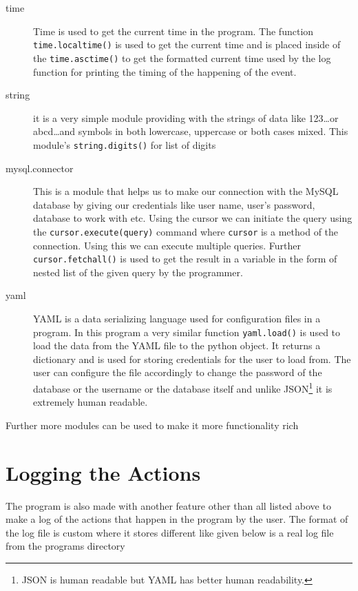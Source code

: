 \documentclass[12pt, a4paper, titlepage, openany]{report}
\begin{document}
\begin{description}
\item[time] Time is used to get the current time in the program. The function \verb+time.localtime()+ is used to get the current time and is placed inside of the \verb+time.asctime()+ to get the formatted current time used by the log function for printing the timing of the happening of the event.
\item[string] it is a very simple module providing with the strings of data like 123\ldots or abcd\ldots and symbols in both lowercase, uppercase or both cases mixed. This module's \verb+string.digits()+ for list of digits
\item[mysql.connector] This is a module that helps us to make our connection with the MySQL database by giving our credentials like user name, user's password, database to work with etc. Using the cursor we can initiate the query using the \verb+cursor.execute(query)+ command where \verb+cursor+ is a method of the connection. Using this we can execute multiple queries. Further \verb+cursor.fetchall()+ is used to get the result in a variable in the form of nested list of the given query by the programmer.
\item[yaml]  YAML is a data serializing language used for configuration files in a program. In this program a very similar function \verb+yaml.load()+ is used to load the data from the YAML file to the python object. It returns a dictionary and is used for storing credentials for the user to load from. The user can configure the file accordingly to change the password of the database or the username or the database itself and unlike JSON\footnote{JSON is human readable but YAML has better human readability.} it is extremely human readable.  


\end{description}

Further more modules can be used to make it more functionality rich 
\newpage

\section{Logging the Actions}
The program is also made with another feature other than all listed above to make a log of the actions that happen in the program by the user. The format of the log file is custom where it stores different like given below is a real log file from the programs directory 
\end{document}
